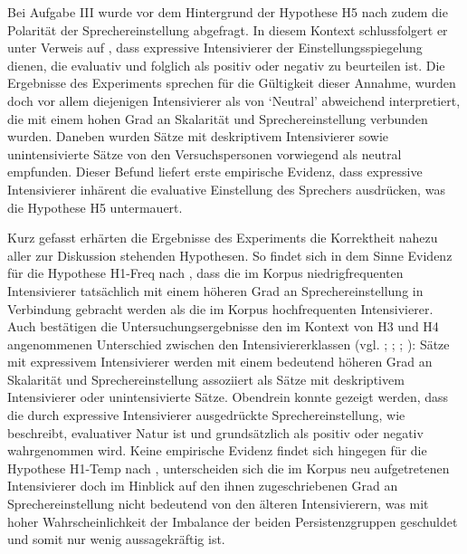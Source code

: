 Bei Aufgabe III wurde vor dem Hintergrund der Hypothese H5 nach {\citet[135]{Gutzmann.2019a}} zudem die Polarität der Sprechereinstellung abgefragt. In diesem Kontext schlussfolgert er unter Verweis auf {\citet[681]{McCready.2008}}, dass expressive Intensivierer der Einstellungsspiegelung dienen, die evaluativ und folglich als positiv oder negativ zu beurteilen ist. Die Ergebnisse des Experiments sprechen für die Gültigkeit dieser Annahme, wurden doch vor allem diejenigen Intensivierer als von `Neutral' abweichend interpretiert, die mit einem hohen Grad an Skalarität und Sprechereinstellung verbunden wurden. Daneben wurden Sätze mit deskriptivem Intensivierer sowie unintensivierte Sätze von den Versuchspersonen vorwiegend als neutral empfunden. Dieser Befund liefert erste empirische Evidenz, dass expressive Intensivierer inhärent die evaluative Einstellung des Sprechers ausdrücken, was die Hypothese H5 untermauert.


Kurz gefasst erhärten die Ergebnisse des Experiments die Korrektheit nahezu aller zur Diskussion stehenden Hypothesen. So findet sich in dem Sinne Evidenz für die Hypothese {H1-Freq} nach {\citet[2]{Hauschild.1899}}, dass die im Korpus niedrigfrequenten Intensivierer tatsächlich mit einem höheren Grad an Sprechereinstellung in Verbindung gebracht werden als die im Korpus hochfrequenten Intensivierer. Auch bestätigen die Untersuchungsergebnisse den im Kontext von H3 und H4 angenommenen Unterschied zwischen den Intensiviererklassen (vgl. \citealt[315]{Lang.1983}; \citealt[22]{Paradis.1997}; \citealt[57]{Ortner.2014}; {\citealt[133]{Gutzmann.2019a}}): Sätze mit expressivem Intensivierer werden mit einem bedeutend höheren Grad an Skalarität und Sprechereinstellung assoziiert als Sätze mit deskriptivem Intensivierer oder unintensivierte Sätze. Obendrein konnte gezeigt werden, dass die durch expressive Intensivierer ausgedrückte Sprechereinstellung, wie {\citet[135]{Gutzmann.2019a}} beschreibt, evaluativer Natur ist und grundsätzlich als positiv oder negativ wahrgenommen wird. Keine empirische Evidenz findet sich hingegen für die {Hypothese H1-Temp} nach {\citet[59]{Tobler.1868}}, unterscheiden sich die im Korpus neu aufgetretenen Intensivierer doch im Hinblick auf den ihnen zugeschriebenen Grad an Sprechereinstellung nicht bedeutend von den älteren Intensivierern, was mit hoher Wahrscheinlichkeit der Imbalance der beiden Persistenzgruppen geschuldet und somit nur wenig aussagekräftig ist.


